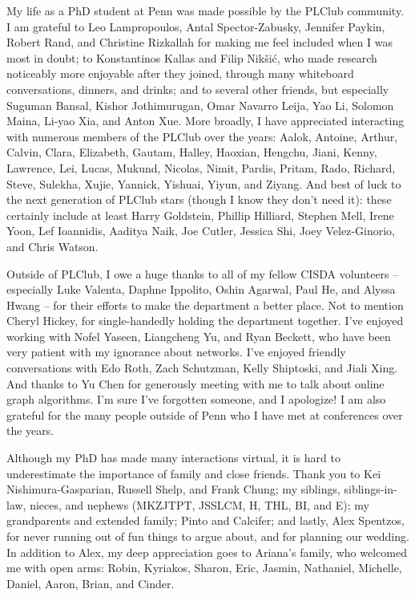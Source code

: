 My life as a PhD student at Penn was made possible by the PLClub community.
I am grateful to Leo Lampropoulos, Antal Spector-Zabusky, Jennifer Paykin, Robert Rand, and Christine Rizkallah for making me feel included when I was most in doubt;
to Konstantinos Kallas and Filip Nikšić, who made research noticeably more enjoyable after they joined, through many whiteboard conversations, dinners, and drinks;
and to several other friends, but especially Suguman Bansal, Kishor Jothimurugan, Omar Navarro Leija, Yao Li, Solomon Maina, Li-yao Xia, and Anton Xue.
More broadly, I have appreciated interacting with numerous members of the PLClub over the years:
Aalok, Antoine, Arthur, Calvin, Clara, Elizabeth, Gautam, Halley, Haoxian, Hengchu, Jiani, Kenny, Lawrence, Lei, Lucas, Mukund, Nicolas, Nimit, Pardis, Pritam, Rado, Richard, Steve, Sulekha, Xujie, Yannick, Yishuai, Yiyun, and Ziyang.
And best of luck to the next generation of PLClub stars
(though I know they don't need it):
these certainly include at least
Harry Goldstein,
Phillip Hilliard,
Stephen Mell,
Irene Yoon,
Lef Ioannidis,
Aaditya Naik,
Joe Cutler,
Jessica Shi,
Joey Velez-Ginorio,
and Chris Watson.

Outside of PLClub, I owe a huge thanks to all of my fellow CISDA volunteers -- especially Luke Valenta, Daphne Ippolito, Oshin Agarwal, Paul He, and Alyssa Hwang -- for their efforts to make the department a better place.
Not to mention Cheryl Hickey, for single-handedly holding the department together.
I've enjoyed working with Nofel Yaseen, Liangcheng Yu, and Ryan Beckett, who have been very patient with my ignorance about networks.
I've enjoyed friendly conversations with Edo Roth, Zach Schutzman, Kelly Shiptoski, and Jiali Xing.
And thanks to Yu Chen for generously meeting with me to talk about online graph algorithms.
I'm sure I've forgotten someone, and I apologize!
I am also grateful for the many people outside of Penn who I have met at conferences over the years.

Although my PhD has made many interactions virtual, it is hard to underestimate the importance of family and close friends.
Thank you to Kei Nishimura-Gasparian, Russell Shelp, and Frank Chung; my siblings, siblings-in-law, nieces, and nephews (MKZJTPT, JSSLCM, H, THL, BI, and E); my grandparents and extended family; Pinto and Calcifer;
and lastly, Alex Spentzos, for never running out of fun things to argue about, and for planning our wedding. In addition to Alex, my deep appreciation goes to Ariana's family, who welcomed me with open arms: Robin, Kyriakos, Sharon, Eric, Jasmin, Nathaniel, Michelle, Daniel, Aaron, Brian, and Cinder.

